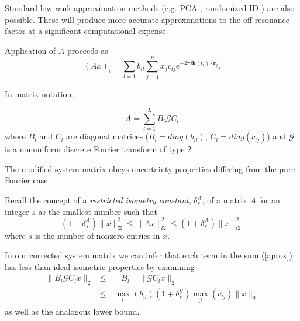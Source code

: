 \documentclass[xcolor=dvipsnames]{beamer}
\theoremstyle{remark}
\begin{document}
\begin{frame}

Standard low rank approximation methods (e.g. PCA \cite{Rokhlin}, randomized ID \cite{Liberty2007}) are also possible. These will produce more accurate approximations to the off resonance factor at a significant computational expense.

\end{frame}

\begin{frame}

Application of $A$ proceeds as
\begin{equation}
(Ax)_i = \sum_{l=1} b_{il} \sum_{j=1}^n x_j c_{lj} e^{-2\pi i \mathbf{k}(t_i) \cdot \mathbf{r}_j}.
\end{equation}

\pause
In matrix notation,

\begin{equation}\label{aprox}
A = \sum_{l=1}^L B_l \mathcal{G} C_l 
\end{equation}
where $B_l$ and $C_l$ are diagonal matrices ($B_l = diag (b_{il})$, $C_l = diag (c_{lj})$) and $\mathcal{G}$ is a nonuniform discrete Fourier transform of type 2 \cite{Greengard2004}.

\end{frame}

\begin{frame}
The modified system matrix obeys uncertainty properties differing from the pure Fourier case.
\pause

Recall the concept of a {\it restricted isometry constant}, $\delta_s^A$, of a matrix $A$ for an integer $s$ as the smallest number such that
\begin{equation}
(1-\delta_s^A)\|x\|_{l2}^2 \leq \|Ax\|_{l2}^2 \leq (1+\delta_s^A)\|x\|_{l2}^2
\end{equation}
where $s$ is the number of nonzero entries in $x$. 

\end{frame}

\begin{frame}
In our corrected system matrix we can infer that each term in the sum (\ref{aprox}) has less than ideal isometric properties by examining
\begin{eqnarray}
\|B_l \mathcal{G} C_l x \|_2 & \leq & \|B_l\| \|\mathcal{G} C_l x\|_2 \\ 
& \leq & \max_i(b_{il}) (1+\delta_s^{\mathcal{G}})\max_j(c_{lj})\| x \|_2
\end{eqnarray}
as well as the analogous lower bound.
\end{frame}
\end{document}
